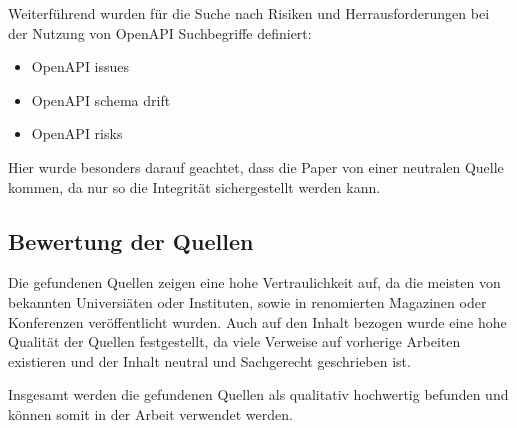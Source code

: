 Weiterführend wurden für die Suche nach Risiken und Herrausforderungen bei der Nutzung 
von OpenAPI Suchbegriffe definiert:

\begin{itemize}
\item OpenAPI issues
\item OpenAPI schema drift
\item OpenAPI risks
\end{itemize}

Hier wurde besonders darauf geachtet, dass die Paper von einer neutralen Quelle kommen, da
nur so die Integrität sichergestellt werden kann.

\subsection{Bewertung der Quellen}

Die gefundenen Quellen zeigen eine hohe Vertraulichkeit auf, da die meisten von bekannten Universiäten oder
Instituten, sowie in renomierten Magazinen oder Konferenzen veröffentlicht wurden.
Auch auf den Inhalt bezogen wurde eine hohe Qualität der Quellen festgestellt, da
viele Verweise auf vorherige Arbeiten existieren und der Inhalt neutral und Sachgerecht geschrieben ist.

Insgesamt werden die gefundenen Quellen als qualitativ hochwertig befunden und können somit in der Arbeit verwendet werden.

